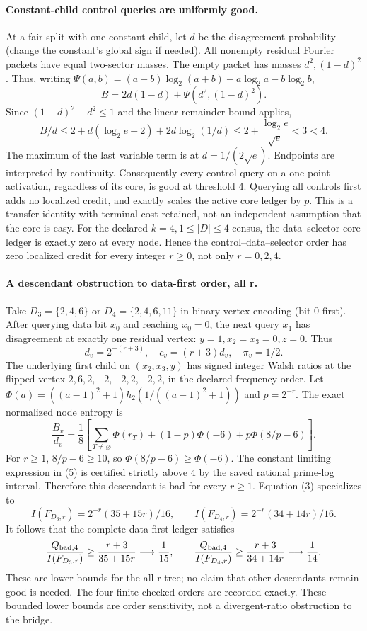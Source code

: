 \documentclass{article}
\begin{document}
\paragraph{Constant-child control queries are uniformly good.}
At a fair split with one constant child, let $d$ be the disagreement
probability (change the constant's global sign if needed).
All nonempty residual Fourier packets have equal two-sector masses.
The empty packet has masses $d^2,(1-d)^2$. Thus, writing
$\Psi(a,b)=(a+b)\log_2(a+b)-a\log_2a-b\log_2b$,
\[
B=2d(1-d)+\Psi(d^2,(1-d)^2).
\]
Since $(1-d)^2+d^2\le1$ and the linear remainder bound applies,
\[
B/d\le2+d(\log_2e-2)+2d\log_2(1/d)
\le2+\frac{\log_2 e}{\sqrt e}<3<4.
\]
The maximum of the last variable term is at $d=1/(2\sqrt e)$.
Endpoints are interpreted by continuity. Consequently every
control query on a one-point activation, regardless of its core,
is good at threshold 4. Querying all controls first adds no
localized credit, and exactly scales the active core ledger by $p$.
This is a transfer identity with terminal cost retained, not an
independent assumption that the core is easy.
For the declared $k=4,1\le|D|\le4$ census, the data--selector
core ledger is exactly zero at every node. Hence the
control--data--selector order has zero localized credit for
every integer $r\ge0$, not only $r=0,2,4$.

\paragraph{A descendant obstruction to data-first order, all r.}
Take $D_3=\{2,4,6\}$ or $D_4=\{2,4,6,11\}$ in binary vertex
encoding (bit 0 first). After querying data bit $x_0$ and reaching
$x_0=0$, the next query $x_1$ has disagreement at exactly one
residual vertex: $y=1,x_2=x_3=0,z=0$. Thus
\[
d_v=2^{-(r+3)},\quad c_v=(r+3)d_v,\quad \pi_v=1/2.
\]
The underlying first child on $(x_2,x_3,y)$ has signed integer Walsh
ratios at the flipped vertex
$2,6,2,-2,-2,2,-2,2$, in the declared frequency order.
Let $\Phi(a)=((a-1)^2+1)h_2(1/((a-1)^2+1))$ and $p=2^{-r}$.
The exact normalized node entropy is
\[
\frac{B_v}{d_v}=
\frac18\left[\sum_{T\ne\varnothing}\Phi(r_T)
+(1-p)\Phi(-6)+p\Phi(8/p-6)\right]. \tag{5}
\]
For $r\ge1$, $8/p-6\ge10$, so $\Phi(8/p-6)\ge\Phi(-6)$.
The constant limiting expression in (5) is certified strictly
above 4 by the saved rational prime-log interval. Therefore this
descendant is bad for every $r\ge1$.
Equation (3) specializes to
\[
I(F_{D_3,r})=2^{-r}(35+15r)/16,\qquad
I(F_{D_4,r})=2^{-r}(34+14r)/16.
\]
It follows that the complete data-first ledger satisfies
\[
\frac{Q_{\rm bad,4}}{I(F_{D_3,r})}
\ge\frac{r+3}{35+15r}\longrightarrow\frac1{15},\qquad
\frac{Q_{\rm bad,4}}{I(F_{D_4,r})}
\ge\frac{r+3}{34+14r}\longrightarrow\frac1{14}.
\]
These are lower bounds for the all-r tree; no claim that other
descendants remain good is needed. The four finite checked orders
are recorded exactly. These bounded lower bounds are order
sensitivity, not a divergent-ratio obstruction to the bridge.
\end{document}
